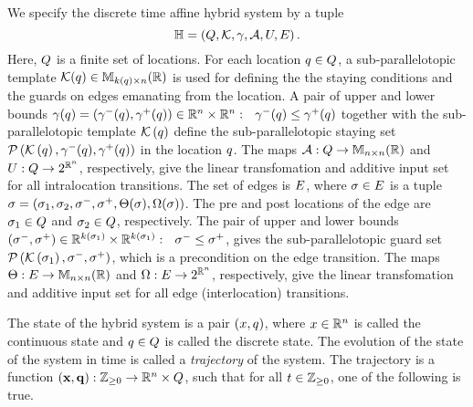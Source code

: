 We specify the discrete time affine hybrid system by a tuple 
%
\[
\mathbb{H} =
\left(Q,\mathcal{K},\gamma,\mathcal{A},U,E\right).
\]
%
Here, $Q$ is a finite set of locations.  For each location
$q\in Q$, a sub-parallelotopic template
$\mathcal{K}(q)\in\mathbb{M}_{k(q)\times n}(\mathbb{\mathbb{R}})$ is used for defining the
the staying conditions and the guards on edges emanating from the
location.  A pair of upper and lower bounds
$\gamma(q)=\left(\gamma^-(q),\gamma^+(q)\right)\in\mathbb{R}^n\times\mathbb{R}^n:
~~\gamma^-(q)\leq\gamma^+(q)$ together with the sub-parallelotopic
template $\mathcal{K}\left(q\right)$ define the sub-parallelotopic
staying set
$\mathcal{P}\left(\mathcal{K}\left(q\right),\gamma^-(q),\gamma^+(q)\right)$ in the
location $q$.  The maps
$\mathcal{A}:Q\rightarrow\mathbb{M}_{n\times n}(\mathbb{R})$ and
$U:Q\rightarrow 2^{\mathbb{R}^n}$, respectively, give the
linear transfomation and additive input set for all intralocation
transitions.  The set of edges is $E$, where $\sigma\in E$
is a tuple $\sigma =
\left(\sigma_{1},\sigma_{2},\sigma^-,\sigma^+,\Theta(\sigma),\Omega(\sigma)\right)$.  The pre and post locations of the edge are
$\sigma_{1}\in Q$ and $\sigma_{2}\in Q$,
respectively.  The pair of upper and lower bounds
$\left(\sigma^-,\sigma^+\right)\in\mathbb{R}^{k\left(\sigma_{1}\right)}\times\mathbb{R}^{k\left(\sigma_{1}\right)}:~~\sigma^-\leq\sigma^+$,
gives the sub-parallelotopic guard set
$\mathcal{P}\left(\mathcal{K}\left(\sigma_{1}\right),\sigma^-,\sigma^+\right)$, which
is a precondition on the edge transition.  The maps
$\Theta:E\rightarrow\mathbb{M}_{n\times n}(\mathbb{R})$ and $\Omega:E\rightarrow
2^{\mathbb{R}^n}$, respectively, give the linear transfomation and
additive input set for all edge (interlocation) transitions.

The state of the hybrid system is a pair $(x,q)$, where
$x\in\mathbb{R}^n$ is called the continuous state and
$q\in Q$ is called the discrete state.  The
evolution of the state of the system in time is called a
\emph{trajectory} of the system.  The trajectory is a function
$\left({\bf x},{\bf q}\right):\mathbb{Z}_{\geq 0}\rightarrow\mathbb{R}^n\times Q$, such
that for all $t\in\mathbb{Z}_{\geq 0}$, one of the following is true.

